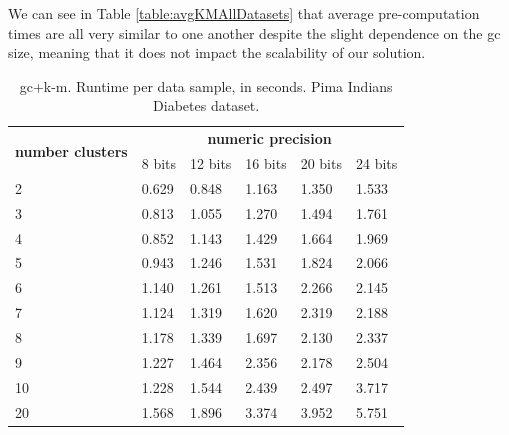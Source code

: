 We can see in Table \ref{table:avgKMAllDatasets} that average pre-computation times are all very similar to one another despite the slight dependence on the \ac{gc} size, meaning that it does not impact the scalability of our solution.



\begin{table}[htp]
\centering
\caption{\acs{gc}+\acs{k-m}. Runtime per data sample, in seconds. Pima Indians Diabetes dataset.}
\label{table:runtimeKMPID}
\begin{tabular}{|l|l|l|l|l|l|}
\hline
\multirow{2}{*}{\textbf{number clusters}} & \multicolumn{5}{c|}{\textbf{numeric precision}}                                              \\ \cline{2-6}
                                          & 8 bits & 12 bits & 16 bits & 20 bits & 24 bits \\ \hline
2                                & 0.629           & 0.848            & 1.163            & 1.350            & 1.533            \\ \hline
3                                & 0.813           & 1.055            & 1.270            & 1.494            & 1.761            \\ \hline
4                                & 0.852           & 1.143            & 1.429            & 1.664            & 1.969            \\ \hline
5                                & 0.943           & 1.246            & 1.531            & 1.824            & 2.066            \\ \hline
6                                & 1.140           & 1.261            & 1.513            & 2.266            & 2.145            \\ \hline
7                                & 1.124           & 1.319            & 1.620            & 2.319            & 2.188            \\ \hline
8                                & 1.178           & 1.339            & 1.697            & 2.130            & 2.337            \\ \hline
9                                & 1.227           & 1.464            & 2.356            & 2.178            & 2.504            \\ \hline
10                               & 1.228           & 1.544            & 2.439            & 2.497            & 3.717            \\ \hline
20                               & 1.568           & 1.896            & 3.374            & 3.952            & 5.751            \\ \hline

\end{tabular}
\end{table}
